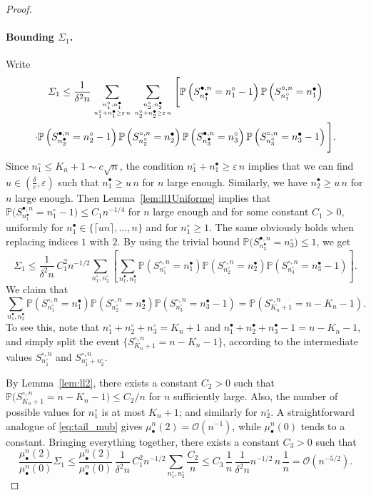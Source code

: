 \documentclass[10pt]{amsart}
\theoremstyle{definition}\newtheorem{defi}[theo]{Definition}\newtheorem{rema}[theo]{Remark}\newtheorem{exam}[theo]{Example}\newtheorem{exem}[theo]{Example}\newtheorem{nota}[theo]{Notation}
\def\eps{\varepsilon}
\def\mubn{\mu_{\bullet}^{n}}
\def\Sbn{S^{\bullet,n}}
\def\Scn{S^{\circ,n}}
\renewcommand\Pr[1]{\mathbb{P}\left(#1\right)}
\newcommand\Prb[1]{\mathbb{P}\big(#1\big)}
\begin{document}
\begin{proof}
\paragraph*{Bounding $\varSigma_1$.} Write
  \begin{multline*}   \varSigma_1 \le \frac{1}{\delta^2 n}
  \sum_{n^\circ_1, n^\bullet_1 \atop n^\circ_1 + n^\bullet_1 \geq \eps\, n}
     \sum_{n^\circ_2, n^\bullet_2 \atop n^\circ_2 + n^\bullet_2 \geq \eps\, n}
     \Bigg[ \Pr{\Sbn_{n^\bullet_1}=n^\circ_1-1} \Pr{\Scn_{n^\circ_1}=n^\bullet_1} \\
     \cdot \Pr{\Sbn_{n^\bullet_2}=n^\circ_2-1} \Pr{\Scn_{n^\circ_2}=n^\bullet_2}
     \Pr{\Sbn_{n^\bullet_3}=n^\circ_3} \Pr{\Scn_{n^\circ_3}=n^\bullet_3-1} \Bigg].
   \end{multline*}
  Since $n^\circ_1 \le K_n+1 \sim c \sqrt{n}$, the condition $n^\circ_1 + n^\bullet_1 \geq \eps\, n$
  implies that we can find  $u \in (\tfrac{\delta}{c},\eps)$ such that  $n^\bullet_1 \geq u\, n$ for $n$ large enough.
  Similarly, we have $n^\bullet_2 \geq u\, n$ for $n$ large enough.
  Then Lemma~\ref{lem:ll1Uniforme} implies that
  $\Prb{\Sbn_{n^\bullet_1}=n^\circ_1-1} \le C_{1} n^{-1/4}$
  for $n$ large enough and for some constant $C_1>0$,
  uniformly for $n^\bullet_1 \in \{ \lceil un \rceil, \dots, n\}$ and for $n^\circ_1 \geq 1$.
  The same obviously holds when replacing indices $1$ with $2$.
By using the trivial bound $\Prb{\Sbn_{n^\bullet_3}=n^\circ_3} \le 1$, we get
  \[\varSigma_1 \le \frac{1}{\delta^2 n} \, C_{1}^2 n^{-1/2}
  \sum_{n^\circ_1, n^\circ_2}
  \left[ \sum_{n^\bullet_1, n^\bullet_2} \Pr{\Scn_{n^\circ_1}=n^\bullet_1}
  \Pr{\Scn_{n^\circ_2}=n^\bullet_2}
  \Pr{\Scn_{n^\circ_3}=n^\bullet_3-1} \right].
  \]
  We claim that
  \[
   \sum_{n^\bullet_1, n^\bullet_2} \Pr{\Scn_{n^\circ_1}=n^\bullet_1}
  \Pr{\Scn_{n^\circ_2}=n^\bullet_2}
  \Pr{\Scn_{n^\circ_3}=n^\bullet_3-1} =\Pr{\Scn_{K_n+1}=n-K_n-1}.\]
To see this, note that $n^\circ_1+n^\circ_2+n^\circ_3= K_n+1$ and $n^\bullet_1+n^\bullet_2+n^{\bullet}_{3}-1=n-K_{n}-1$,
and simply split the event $\{\Scn_{K_n+1}=n-K_n-1\}$,
  according to the intermediate values $\Scn_{n^\circ_1}$ and $\Scn_{n^\circ_1+n^\circ_2}$.


  By Lemma~\ref{lem:ll2}, there exists a constant $C_{2}>0$ such that  $\Prb{\Scn_{K_n+1}=n-K_n-1}   \leq C_{2}/n$ for $n$ sufficiently large. Also, the number of possible values for $n^\circ_1$ is at most $K_n+1$; and similarly for $n^\circ_2$.
  A straightforward analogue of \eqref{eq:tail_mub} gives $\mubn(2)=\mathcal O(n^{-1})$,
  while $\mubn(0)$ tends to a constant.
  Bringing everything together, there exists a constant $C_{3}>0$ such that
  \[ \frac{\mubn(2)}{\mubn(0)} \varSigma_1 \le  \frac{\mubn(2)}{\mubn(0)} \, \frac{1}{\delta^2 n} \, C_{1}^2 n^{-1/2}
  \sum_{n^\circ_1, n^\circ_2}
   \frac{C_{2}}{n}
 \le
 C_{3} \, \frac{1}{n} \, \frac{1}{\delta^2 n}  n^{-1/2}\,  n  \, \frac{1}{n}=\mathcal O(n^{-5/2}).\]


\end{proof}
\end{document}
